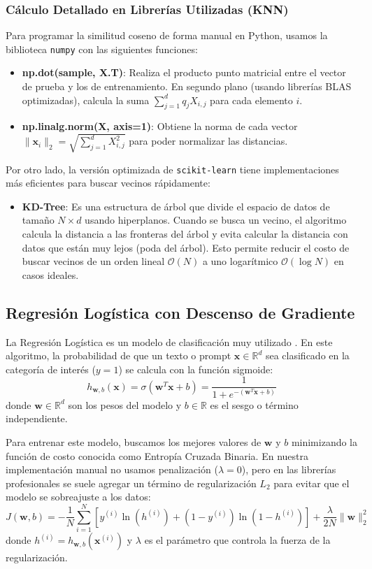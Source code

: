 \documentclass[twocolumn,10pt,journal]{IEEEtran}
\begin{document}
\subsubsection{Cálculo Detallado en Librerías Utilizadas (KNN)}
Para programar la similitud coseno de forma manual en Python, usamos la biblioteca \texttt{numpy} con las siguientes funciones:
\begin{itemize}
    \item \textbf{np.dot(sample, X.T)}: Realiza el producto punto matricial entre el vector de prueba y los de entrenamiento. En segundo plano (usando librerías BLAS optimizadas), calcula la suma $\sum_{j=1}^d q_j X_{i,j}$ para cada elemento $i$.
    \item \textbf{np.linalg.norm(X, axis=1)}: Obtiene la norma de cada vector $\|\mathbf{x}_i\|_2 = \sqrt{\sum_{j=1}^d X_{i,j}^2}$ para poder normalizar las distancias.
\end{itemize}
Por otro lado, la versión optimizada de \texttt{scikit-learn} tiene implementaciones más eficientes para buscar vecinos rápidamente:
\begin{itemize}
    \item \textbf{KD-Tree}: Es una estructura de árbol que divide el espacio de datos de tamaño $N \times d$ usando hiperplanos. Cuando se busca un vecino, el algoritmo calcula la distancia a las fronteras del árbol y evita calcular la distancia con datos que están muy lejos (poda del árbol). Esto permite reducir el costo de buscar vecinos de un orden lineal $\mathcal{O}(N)$ a uno logarítmico $\mathcal{O}(\log N)$ en casos ideales.
\end{itemize}

\subsection{Regresión Logística con Descenso de Gradiente}
La Regresión Logística es un modelo de clasificación muy utilizado \cite{hastie2009}. En este algoritmo, la probabilidad de que un texto o prompt $\mathbf{x} \in \mathbb{R}^d$ sea clasificado en la categoría de interés ($y = 1$) se calcula con la función sigmoide:
\begin{equation}
h_{\mathbf{w}, b}(\mathbf{x}) = \sigma(\mathbf{w}^T \mathbf{x} + b) = \frac{1}{1 + e^{-(\mathbf{w}^T \mathbf{x} + b)}}
\end{equation}
donde $\mathbf{w} \in \mathbb{R}^d$ son los pesos del modelo y $b \in \mathbb{R}$ es el sesgo o término independiente.

Para entrenar este modelo, buscamos los mejores valores de $\mathbf{w}$ y $b$ minimizando la función de costo conocida como Entropía Cruzada Binaria. En nuestra implementación manual no usamos penalización ($\lambda = 0$), pero en las librerías profesionales se suele agregar un término de regularización $L_2$ para evitar que el modelo se sobreajuste a los datos:
\begin{equation}
J(\mathbf{w}, b) = -\frac{1}{N} \sum_{i=1}^N \left[ y^{(i)} \ln(h^{(i)}) + (1-y^{(i)}) \ln(1-h^{(i)}) \right] + \frac{\lambda}{2N} \|\mathbf{w}\|_2^2
\end{equation}
donde $h^{(i)} = h_{\mathbf{w}, b}(\mathbf{x}^{(i)})$ y $\lambda$ es el parámetro que controla la fuerza de la regularización.
\end{document}

